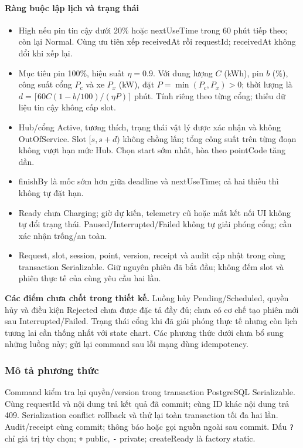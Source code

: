 \paragraph{Ràng buộc lập lịch và trạng thái}
\begin{itemize}
\item High nếu pin tin cậy dưới 20\% hoặc nextUseTime trong 60 phút tiếp theo; còn lại Normal. Cùng ưu tiên xếp receivedAt rồi requestId; receivedAt không đổi khi xếp lại.
\item Mục tiêu pin 100\%, hiệu suất $\eta=0.9$. Với dung lượng $C$ (kWh), pin $b$ (\%), công suất cổng $P_c$ và xe $P_x$ (kW), đặt $P=\min(P_c,P_x)>0$; thời lượng là $d=\lceil60C(1-b/100)/(\eta P)\rceil$ phút. Tính riêng theo từng cổng; thiếu dữ liệu tin cậy không cấp slot.
\item Hub/cổng Active, tương thích, trạng thái vật lý được xác nhận và không OutOfService. Slot $[s,s+d)$ không chồng lấn; tổng công suất trên từng đoạn không vượt hạn mức Hub. Chọn start sớm nhất, hòa theo pointCode tăng dần.
\item finishBy là mốc sớm hơn giữa deadline và nextUseTime; cả hai thiếu thì không tự đặt hạn.
\item Ready chưa Charging; giờ dự kiến, telemetry cũ hoặc mất kết nối UI không tự đổi trạng thái. Paused/Interrupted/Failed không tự giải phóng cổng; cần xác nhận trống/an toàn.
\item Request, slot, session, point, version, receipt và audit cập nhật trong cùng transaction Serializable. Giữ nguyên phiên đã bắt đầu; không đếm slot và phiên thực tế của cùng yêu cầu hai lần.
\end{itemize}

\textbf{Các điểm chưa chốt trong thiết kế.} Luồng hủy Pending/Scheduled, quyền hủy và điều kiện Rejected chưa được đặc tả đầy đủ; chưa có cơ chế tạo phiên mới sau Interrupted/Failed. Trạng thái cổng khi đã giải phóng thực tế nhưng còn lịch tương lai cần thống nhất với state chart. Các phương thức dưới chưa bổ sung những luồng này; gửi lại command sau lỗi mạng dùng idempotency.

\subsubsection{Mô tả phương thức}
Command kiểm tra lại quyền/version trong transaction PostgreSQL Serializable. Cùng requestId và nội dung trả kết quả đã commit; cùng ID khác nội dung trả 409. Serialization conflict rollback và thử lại toàn transaction tối đa hai lần. Audit/receipt cùng commit; thông báo hoặc gọi nguồn ngoài sau commit. Dấu \texttt{?} chỉ giá trị tùy chọn; \texttt{+} public, \texttt{-} private; createReady là factory static.

